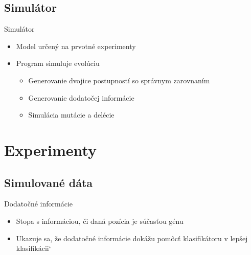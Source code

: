 \documentclass[xcolor=dvipsnames, compress, 12pt]{beamer}
\begin{document}

\subsection{Simulátor}
\begin{frame}{Simulátor}
  \begin{itemize}
    \item Model určený na prvotné experimenty
    \item Program simuluje evolúciu
    \begin{itemize}
      \item Generovanie dvojice postupností so správnym zarovnaním
      \item Generovanie dodatočej informácie
      \item Simulácia mutácie a delécie
    \end{itemize} 
  \end{itemize} 
\end{frame}

\section{Experimenty}
\subsection{Simulované dáta}
\begin{frame}{Dodatočné informácie}  
  \begin{itemize}
    \item Stopa s informáciou, či daná pozícia je súčasťou génu
    \item Ukazuje sa, že dodatočné informácie dokážu pomôcť klasifikátoru v lepšej klasifikácii`
  \end{itemize} 
\end{frame}
\end{document}
